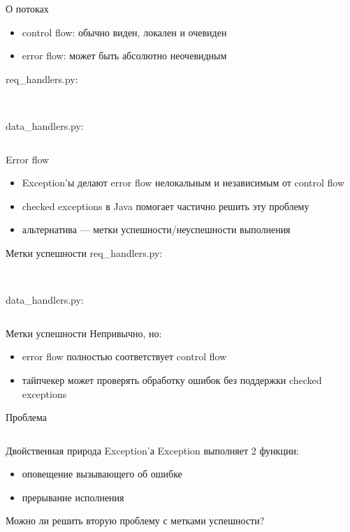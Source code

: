 \documentclass[10pt]{beamer}
\newcommand{\code}[4]{\inputminted[linenos, frame=none, firstline=#2, lastline=#3,
  framesep=10pt, bgcolor=lightgray]{#4}{#1}}
\begin{document}
\begin{frame}{О потоках}
  \begin{itemize}
  \item control flow: обычно виден, локален и очевиден
  \item error flow: может быть абсолютно неочевидным
  \end{itemize}
  req\_handlers.py:
  \code{code.py}{28}{32}{python}\vspace{5pt}\\
  data\_handlers.py:
  \code{code.py}{34}{38}{python}
\end{frame}

\begin{frame}{Error flow}
  \begin{itemize}
  \item Exception'ы делают error flow нелокальным и независимым от control flow
  \item checked exceptions в Java помогает частично решить эту проблему
  \item альтернатива — метки успешности/неуспешности выполнения
  \end{itemize}
\end{frame}

\begin{frame}{Метки успешности}
  req\_handlers.py:
  \code{code.py}{40}{42}{python}\vspace{5pt}\\
  data\_handlers.py:
  \code{code.py}{44}{46}{python}
\end{frame}

\begin{frame}{Метки успешности}
  Непривычно, но:
  \begin{itemize}
  \item error flow полностью соответствует control flow
  \item тайпчекер может проверять обработку ошибок без поддержки checked exceptions
  \end{itemize}
\end{frame}

\begin{frame}{Проблема}
  \code{code.py}{48}{55}{python}
\end{frame}

\begin{frame}{Двойственная природа Exception'а}
  Exception выполняет 2 функции:
  \begin{itemize}
  \item оповещение вызывающего об ошибке
  \item прерывание исполнения
  \end{itemize}
  Можно ли решить вторую проблему с метками успешности?
\end{frame}
\end{document}
